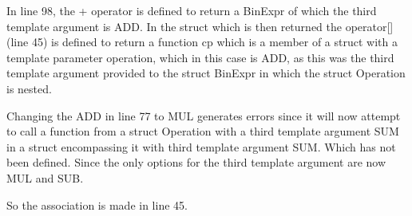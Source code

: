 In line 98, the + operator is defined to return a BinExpr of which the third template argument is ADD. In the struct which is then returned the operator[] (line 45) is defined to return a function cp which is a member of a struct with a template parameter operation, which in this case is ADD, as this was the third template argument provided to the struct BinExpr in which the struct Operation is nested.

Changing the ADD in line 77 to MUL generates errors since it will now attempt to call a function from a struct Operation with a third template argument SUM in a struct encompassing it with third template argument SUM. Which has not been defined. Since the only options for the third template argument are now MUL and SUB.

So the association is made in line 45.
